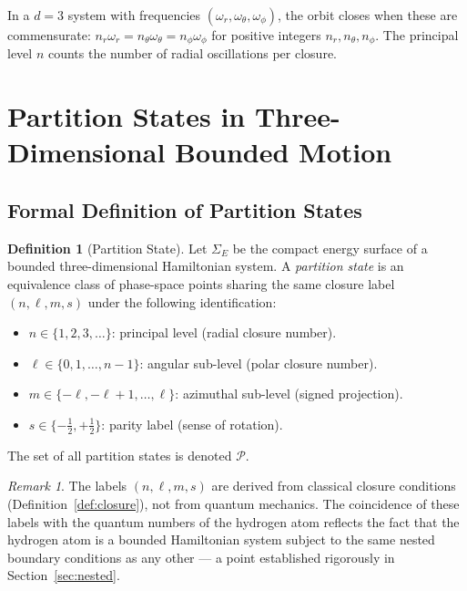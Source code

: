 \documentclass[twocolumn,10pt,a4paper]{article}
\theoremstyle{thmstyle}
\theoremstyle{definition}
\newtheorem{definition}[theorem]{Definition}
\theoremstyle{remark}
\newtheorem{remark}[theorem]{Remark}
\newcommand{\Parts}{\mathcal{P}}
\begin{document}
In a $d=3$ system with frequencies $(\omega_r, \omega_\theta, \omega_\phi)$, the orbit closes when these are commensurate: $n_r \omega_r = n_\theta \omega_\theta = n_\phi \omega_\phi$ for positive integers $n_r, n_\theta, n_\phi$. The principal level $n$ counts the number of radial oscillations per closure.

\section{Partition States in Three-Dimensional Bounded Motion}
\label{sec:partition}

\subsection{Formal Definition of Partition States}

\begin{definition}[Partition State]
\label{def:part-state}
Let $\Sigma_E$ be the compact energy surface of a bounded three-dimensional Hamiltonian system. A \emph{partition state} is an equivalence class of phase-space points sharing the same closure label $(n, \ell, m, s)$ under the following identification:
\begin{itemize}[leftmargin=1.2em,itemsep=0.1em]
\item $n \in \{1, 2, 3, \ldots\}$: principal level (radial closure number).
\item $\ell \in \{0, 1, \ldots, n-1\}$: angular sub-level (polar closure number).
\item $m \in \{-\ell, -\ell+1, \ldots, \ell\}$: azimuthal sub-level (signed projection).
\item $s \in \{-\tfrac{1}{2}, +\tfrac{1}{2}\}$: parity label (sense of rotation).
\end{itemize}
The set of all partition states is denoted $\Parts$.
\end{definition}

\begin{remark}
The labels $(n, \ell, m, s)$ are derived from classical closure conditions (Definition~\ref{def:closure}), not from quantum mechanics. The coincidence of these labels with the quantum numbers of the hydrogen atom \citep{bohr1920,schrodinger1926} reflects the fact that the hydrogen atom is a bounded Hamiltonian system subject to the same nested boundary conditions as any other --- a point established rigorously in Section~\ref{sec:nested}.
\end{remark}
\end{document}
